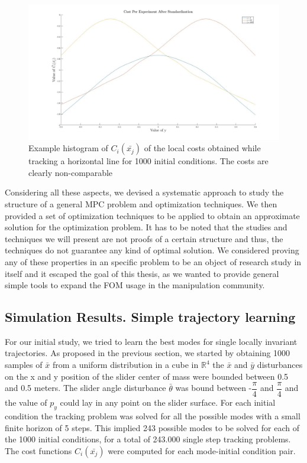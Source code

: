 \documentclass[12,twoside]{TFG-GM}
\theoremstyle{definition}
\theoremstyle{remark}
\newcommand*\diff[1]{\bar{#1}}
\begin{document}
\begin{figure}[htb!]
\begin{center}
\includegraphics[width=16cm]{costs_over_mode_straight_line.jpg}
\end{center}
\caption{\label{fig:costs_over_mode_straight_line} \small Example histogram of $C_i(\diff{x_j})$ of the local costs obtained while tracking a horizontal line for 1000 initial conditions. The costs are clearly non-comparable}
\end{figure}

Considering all these aspects, we devised a systematic approach to study the structure of a general MPC problem and optimization techniques. We then provided a set of optimization techniques to be applied to obtain an approximate solution for the optimization problem. It has to be noted that the studies and techniques we will present are not proofs of a certain structure and thus, the techniques do not guarantee any kind of optimal solution. We considered proving any of these properties in an specific problem to be an object of research study in itself and it escaped the goal of this thesis, as we wanted to provide general simple tools to expand the FOM usage in the manipulation community.

\subsection{Simulation Results. Simple trajectory learning}
\label{subsec:learningsimple}
For our initial study, we tried to learn the best modes for single locally invariant trajectories. As proposed in the previous section, we started by obtaining 1000 samples of $\diff{x}$ from a uniform distribution in a cube in $\mathbb{R}^4$ the $\diff{x}$ and $\diff{y}$ disturbances on the x and y position of the slider center of mass were bounded between 0.5 and 0.5 meters. The slider angle disturbance $\diff{\theta}$ was bound between -$\dfrac{\pi}{4}$ and $\dfrac{\pi}{4}$ and the value of $p_y$ could lay in any point on the slider surface. For each initial condition the tracking problem was solved for all the possible modes with a small finite horizon of 5 steps. This implied 243 possible modes to be solved for each of the 1000 initial conditions, for a total of 243.000 single step tracking problems. The cost functions $C_i(\diff{x_j})$ were computed for each mode-initial condition pair.
\end{document}

